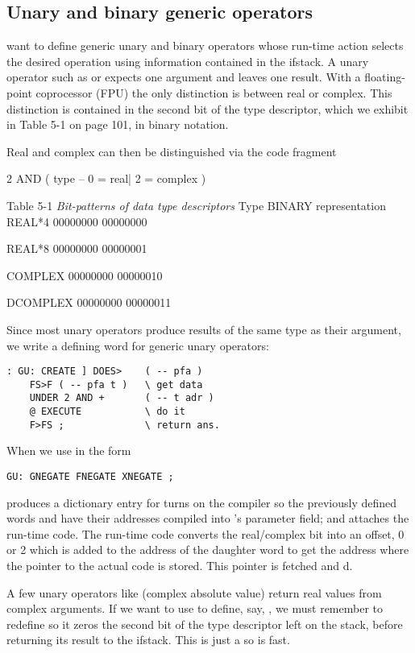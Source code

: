 \subsection{Unary and binary generic operators}

 want to define generic unary and binary operators whose run-time action selects the desired operation using information contained in the ifstack. A unary operator such as  or  expects one argument and leaves one result. With a floating-point coprocessor (FPU) the only distinction is between real or complex. This distinction is contained in the second bit of the type descriptor, which we exhibit in Table 5-1 on page 101, in binary notation.

Real and complex can then be distinguished via the code fragment

2 AND ( type -- 0 = real| 2 = complex )

Table 5-1 \textit{Bit-patterns of data type descriptors}
Type BINARY representation
REAL*4      00000000 00000000

REAL*8      00000000 00000001

COMPLEX     00000000 00000010

DCOMPLEX    00000000 00000011

Since most unary operators produce results of the same type as their argument, we write a defining word for generic unary operators:

\begin{lstlisting}
: GU: CREATE ] DOES>    ( -- pfa )
    FS>F ( -- pfa t )   \ get data
    UNDER 2 AND +       ( -- t adr )
    @ EXECUTE           \ do it
    F>FS ;              \ return ans.
\end{lstlisting}

When we use  in the form
\begin{lstlisting}
GU: GNEGATE FNEGATE XNEGATE ;
\end{lstlisting}

 produces a dictionary entry for \bc{GNEGATE; ]} turns on the compiler so the previously defined words  and  have their addresses compiled into 's parameter field; and  attaches the run-time code. The run-time code converts the real/complex bit into an offset, 0 or 2 which is added to the address of the daughter word to get the address where the pointer to the actual code is stored. This pointer is fetched and d.

A few unary operators like  (complex absolute value) return real values from complex arguments. If we want to use  to define, say, , we must remember to redefine  so it zeros the second bit of the type descriptor left on the stack, before returning its result to the ifstack. This is just a  so is fast.

